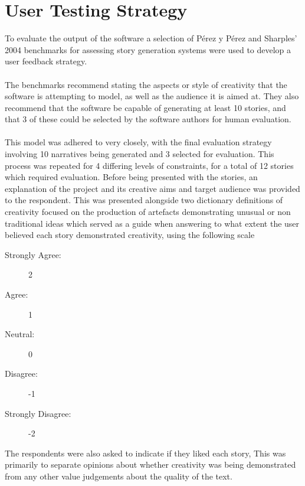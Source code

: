 \documentclass[letterpaper]{article}
\begin{document}
\section{User Testing Strategy}
To evaluate the output of the software a selection of P\'erez y P\'erez and Sharples' 2004 benchmarks for assessing story generation systems were used to develop a user feedback strategy.\\
\\The benchmarks recommend stating the aspects or style of creativity that the software is attempting to model, as well as the audience it is aimed at. They also recommend that the software be capable of generating at least 10 stories, and that 3 of these could be selected by the software authors for human evaluation.\\ 
\\This model was adhered to very closely, with the final evaluation strategy involving 10 narratives being generated and 3 selected for evaluation. This process was repeated for 4 differing levels of constraints, for a total of 12 stories which required evaluation. Before being presented with the stories, an explanation of the project and its creative aims and target audience was provided to the respondent. This was presented alongside two dictionary definitions of creativity focused on the production of artefacts demonstrating unusual or non traditional ideas which served as a guide when answering to what extent the user believed each story demonstrated creativity, using the following scale
\begin{description}
\item[Strongly Agree:] 2
\item[Agree:] 1
\item[Neutral:] 0
\item[Disagree:] -1
\item[Strongly Disagree:] -2
\end{description} 
The respondents were also asked to indicate if they liked each story, This was primarily to separate opinions about whether creativity was being demonstrated from any other value judgements about the quality of the text.
\end{document}
